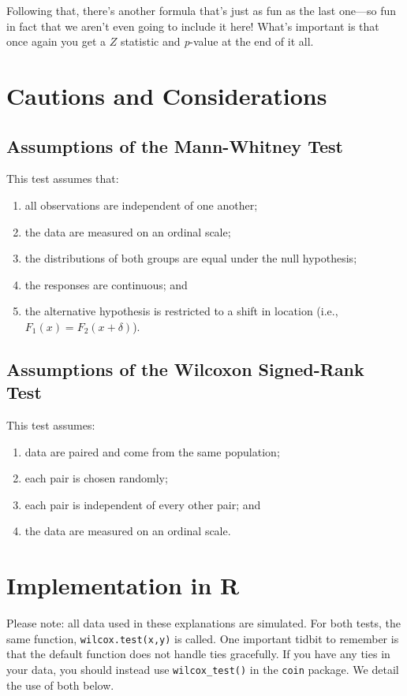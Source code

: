 Following  that,  there's  another  formula that's  just  as  fun  as the  last  one---so  fun in fact that we aren't even going to include  it here!  What's important  is that once again you get a $Z$ statistic and \textit{p}-value at the  end of  it  all.

\section{Cautions and Considerations}

\subsection{Assumptions of the Mann-Whitney Test}

This test assumes that:
\begin{enumerate}
\item all observations are independent of one another;
\item the data are measured on an ordinal scale;
\item the distributions of both groups are equal under the null hypothesis;
\item the responses are continuous; and
\item the alternative hypothesis is restricted to a shift in location (i.e., $F_1(x)=F_2(x+\delta)$).
\end{enumerate}

\subsection{Assumptions  of  the Wilcoxon Signed-Rank Test}

This test assumes:
\begin{enumerate}
\item data are paired and come from the same population;
\item each pair is chosen randomly;
\item each pair is independent of every other pair; and
\item the data are measured on an ordinal scale.
\end{enumerate}

\section{Implementation in R}

Please note: all data used in these explanations are simulated. For both tests, the same function, \verb|wilcox.test(x,y)| is called. One important tidbit to remember is that the default function does not handle ties gracefully. If you have any ties in your data, you should instead use \verb|wilcox_test()| in the \verb|coin| package. We detail the use of both below.

